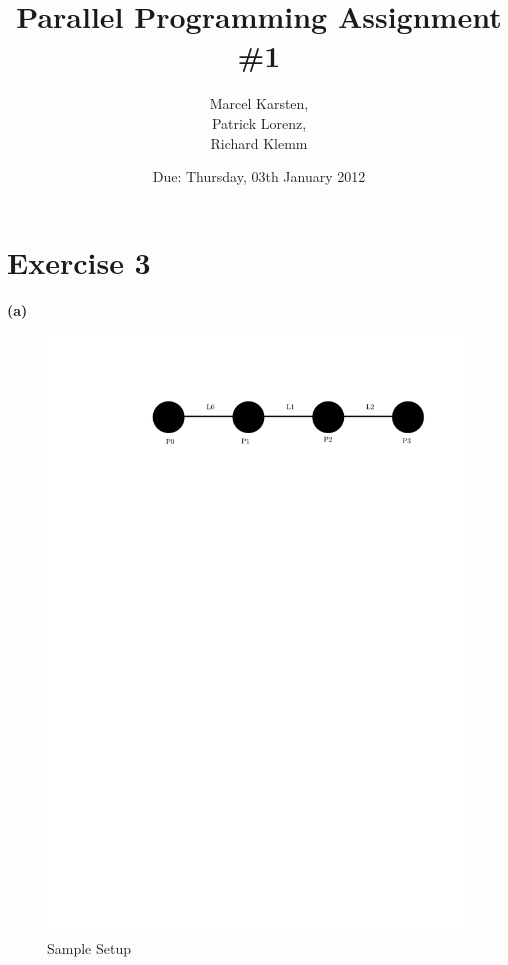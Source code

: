 \documentclass[a4paper,twoside,11pt]{article}
\begin{document}
\pagestyle{fancyplain}

\title{Parallel Programming Assignment \#1} 
\author{Marcel Karsten,\\ Patrick Lorenz,\\ Richard Klemm}
\date{Due: Thursday, 03th January 2012} %
\maketitle

\lhead{}
\renewcommand{\headrulewidth}{0px}



\section{Exercise 3}
\textbf{(a)}
\begin{figure}[!htbp]
    \begin{center}
        \includegraphics[scale=1]{3a_1.pdf}
    \end{center}
    \caption{Sample Setup}
    \label{SampleSetup}
\end{figure}
\end{document}
